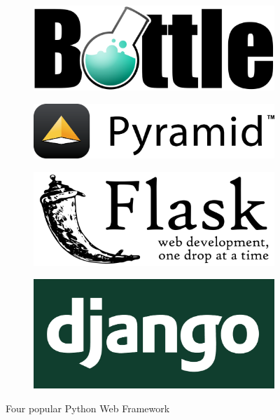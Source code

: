 \begin{figure}
\centering
\begin{subfigure}{.24\textwidth}
  \centering
  \includegraphics[width=0.8\linewidth]{images/bottle.png}
\end{subfigure}%
\begin{subfigure}{.24\textwidth}
  \centering
  \includegraphics[width=0.8\linewidth]{images/pyramid.png}
\end{subfigure}
\begin{subfigure}{.24\textwidth}
  \centering
  \includegraphics[width=0.8\linewidth]{images/flask.png}
\end{subfigure}
\begin{subfigure}{.24\textwidth}
  \centering
  \includegraphics[width=0.8\linewidth]{images/django.png}
\end{subfigure}
\caption{Four popular Python Web Framework}
\label{fig:webframeworks}
\end{figure}


